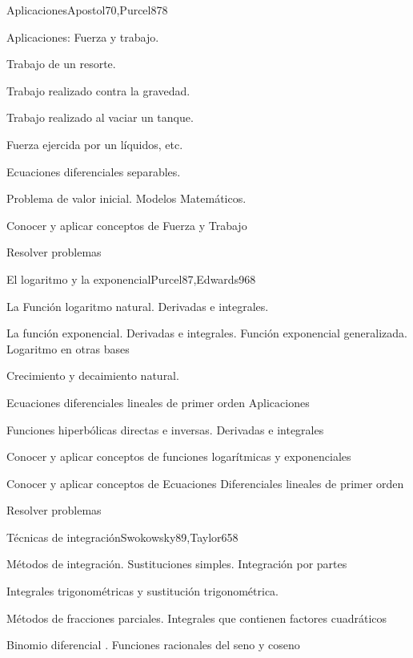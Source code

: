 \begin{syllabus}
\begin{unit}{Aplicaciones}{Apostol70,Purcel87}{8}
\begin{topics}
      \item Aplicaciones: Fuerza y trabajo. 
      \item Trabajo de un resorte. 
      \item Trabajo realizado contra la gravedad. 
      \item Trabajo realizado al vaciar un tanque. 
      \item Fuerza ejercida por un líquidos, etc.
      \item Ecuaciones diferenciales separables. 
      \item Problema de valor inicial. Modelos Matemáticos.
\end{topics}

\begin{learningoutcomes}
	\item Conocer y aplicar conceptos de Fuerza y Trabajo
	\item Resolver problemas
\end{learningoutcomes}
\end{unit}

\begin{unit}{El logaritmo y la exponencial}{Purcel87,Edwards96}{8}
\begin{topics}
	\item La Función logaritmo natural. Derivadas e integrales.
	\item La función exponencial. Derivadas e integrales. Función exponencial  generalizada. Logaritmo en otras bases
	\item Crecimiento y decaimiento natural. 
	\item Ecuaciones diferenciales lineales de primer orden Aplicaciones
	\item Funciones hiperbólicas directas e inversas. Derivadas e integrales
\end{topics}

\begin{learningoutcomes}
	\item Conocer y aplicar conceptos de funciones logarítmicas y exponenciales
	\item Conocer y aplicar conceptos de Ecuaciones Diferenciales lineales de primer orden
	\item Resolver problemas
\end{learningoutcomes}
\end{unit}

\begin{unit}{Técnicas de integración}{Swokowsky89,Taylor65}{8}
\begin{topics}
	\item Métodos de integración. Sustituciones simples. Integración por partes
	\item Integrales trigonométricas y sustitución trigonométrica.
	\item Métodos de fracciones parciales. Integrales que contienen factores  cuadráticos
	\item Binomio diferencial . Funciones racionales del seno y coseno
\end{topics}


\end{unit}
\end{syllabus}
